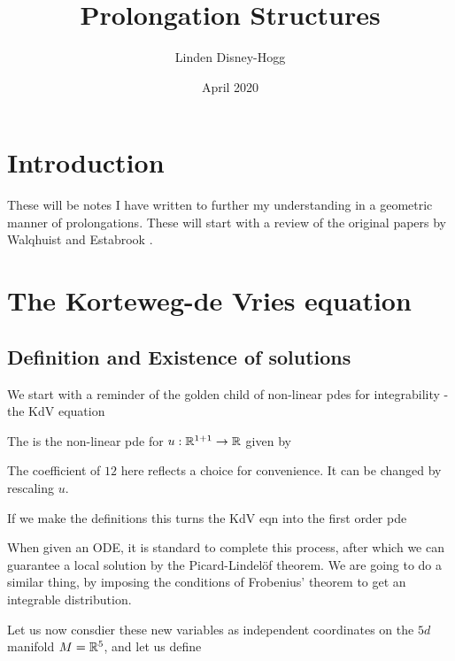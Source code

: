 \documentclass{article}
\title{Prolongation Structures}
\author{Linden Disney-Hogg}
\date{April 2020}
\begin{document}
\maketitle
\tableofcontents

\section{Introduction}
These will be notes I have written to further my understanding in a geometric manner of prolongations. These will start with a review of the original papers by Walqhuist and Estabrook \cite{Wahlquist1975,Estabrook1976}.

\section{The Korteweg-de Vries equation}
\subsection{Definition and Existence of solutions}
We start with a reminder of the golden child of non-linear pdes for integrability - the KdV equation

\begin{definition}
	The  is the non-linear pde for $u: \mathbb{R}^{1+1} \to \mathbb{R}$ given by 
\end{definition}

\begin{remark}
	The coefficient of $12$ here reflects a choice for convenience. It can be changed by rescaling $u$. 
\end{remark}
If we make the definitions
this turns the KdV eqn into the first order pde 
\begin{remark}
	When given an ODE, it is standard to complete this process, after which we can guarantee a local solution by the Picard-Lindel\"of theorem. We are going to do a similar thing, by imposing the conditions of Frobenius' theorem to get an integrable distribution. 
\end{remark}
Let us now consdier these new variables as independent coordinates on the $5d$ manifold $M=\mathbb{R}^5$, and let us define
\end{document}
